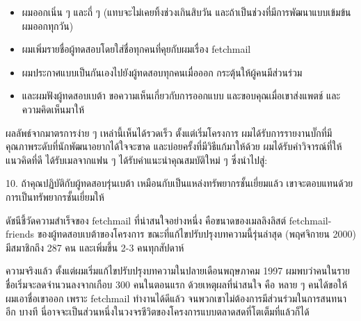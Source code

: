 \begin{itemize}
  \item
        ผมออกเนิ่น ๆ  และถี่ ๆ  (แทบจะไม่เคยทิ้งช่วงเกินสิบวัน
        และถ้าเป็นช่วงที่มีการพัฒนาแบบเข้มข้น ผมออกทุกวัน)
  \item
        ผมเพิ่มรายชื่อผู้ทดสอบโดยใส่ชื่อทุกคนที่คุยกับผมเรื่อง fetchmail
  \item
        ผมประกาศแบบเป็นกันเองไปยังผู้ทดสอบทุกคนเมื่อออก
        กระตุ้นให้ผู้คนมีส่วนร่วม
  \item
        และผมฟังผู้ทดสอบเบต้า ขอความเห็นเกี่ยวกับการออกแบบ
        และขอบคุณเมื่อเขาส่งแพตช์ และความคิดเห็นมาให้
\end{itemize}

ผลลัพธ์จากมาตรการง่าย ๆ  เหล่านี้เห็นได้รวดเร็ว ตั้งแต่เริ่มโครงการ
ผมได้รับการรายงานบั๊กที่มีคุณภาพระดับที่นักพัฒนาอยากได้ใจจะขาด
และบ่อยครั้งที่มีวิธีแก้มาให้ด้วย ผมได้รับคำวิจารณ์ที่ให้แนวคิดที่ดี
ได้รับเมลจากแฟน ๆ  ได้รับคำแนะนำคุณสมบัติใหม่ ๆ  ซึ่งนำไปสู่:

\begin{fancyquotes}
  10. ถ้าคุณปฏิบัติกับผู้ทดสอบรุ่นเบต้า
  เหมือนกับเป็นแหล่งทรัพยากรชั้นเยี่ยมแล้ว
  เขาจะตอบแทนด้วยการเป็นทรัพยากรชั้นเยี่ยมให้
\end{fancyquotes}

ดัชนีชี้วัดความสำเร็จของ fetchmail ที่น่าสนใจอย่างหนึ่ง
คือขนาดของเมลลิงลิสต์ fetchmail-friends ของผู้ทดสอบเบต้าของโครงการ
ขณะที่แก้ไขปรับปรุงบทความนี้รุ่นล่าสุด (พฤศจิกายน 2000) มีสมาชิกถึง 287
คน และเพิ่มขึ้น 2-3 คนทุกสัปดาห์

ความจริงแล้ว ตั้งแต่ผมเริ่มแก้ไขปรับปรุงบทความในปลายเดือนพฤษภาคม 1997
ผมพบว่าคนในรายชื่อเริ่มจะลดจำนวนลงจากเกือบ 300 คนในตอนแรก
ด้วยเหตุผลที่น่าสนใจ คือ หลาย ๆ  คนได้ขอให้ผมเอาชื่อเขาออก เพราะ fetchmail
ทำงานได้ดีแล้ว จนพวกเขาไม่ต้องการมีส่วนร่วมในการสนทนาอีก บางที
นี่อาจจะเป็นส่วนหนึ่งในวงจรชีวิตของโครงการแบบตลาดสดที่โตเต็มที่แล้วก็ได้